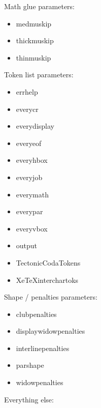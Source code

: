 Math glue parameters:

\begin{itemize}
  \item medmuskip
  \item thickmuskip
  \item thinmuskip
\end{itemize}

Token list parameters:

\begin{itemize}
  \item errhelp
  \item everycr
  \item everydisplay
  \item everyeof
  \item everyhbox
  \item everyjob
  \item everymath
  \item everypar
  \item everyvbox
  \item output
  \item TectonicCodaTokens
  \item XeTeXinterchartoks
\end{itemize}

Shape / penalties parameters:

\begin{itemize}
  \item clubpenalties
  \item displaywidowpenalties
  \item interlinepenalties
  \item parshape
  \item widowpenalties
\end{itemize}

Everything else:

